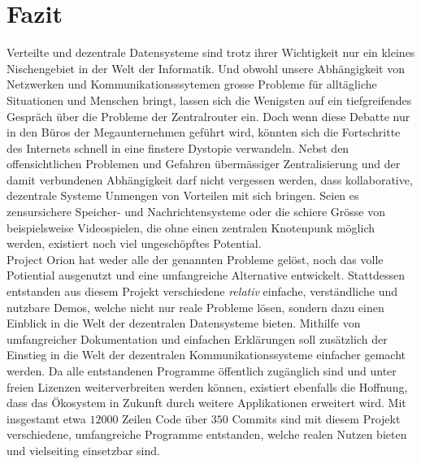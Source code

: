 \documentclass[11pt]{article}
\begin{document}
\section{Fazit}
\label{sec:org03182dd}
Verteilte und dezentrale Datensysteme sind trotz ihrer Wichtigkeit nur
ein kleines Nischengebiet in der Welt der Informatik. Und obwohl
unsere Abhängigkeit von Netzwerken und Kommunikationsssytemen grosse
Probleme für alltägliche Situationen und Menschen bringt, lassen sich
die Wenigsten auf ein tiefgreifendes Gespräch über die Probleme der
Zentralrouter ein. Doch wenn diese Debatte nur in den Büros der
Megaunternehmen geführt wird, könnten sich die Fortschritte des
Internets schnell in eine finstere Dystopie verwandeln. Nebst den
offensichtlichen Problemen und Gefahren übermässiger Zentralisierung
und der damit verbundenen Abhängigkeit darf nicht vergessen werden,
dass kollaborative, dezentrale Systeme Unmengen von Vorteilen mit sich
bringen. Seien es zensursichere Speicher- und Nachrichtensysteme oder
die schiere Grösse von beispielsweise Videospielen, die ohne einen
zentralen Knotenpunk möglich werden, existiert noch viel ungeschöpftes
Potential.\\

\noindent Project Orion hat weder alle der genannten Probleme gelöst,
noch das volle Potiential ausgenutzt und eine umfangreiche Alternative
entwickelt. Stattdessen entstanden aus diesem Projekt verschiedene
\emph{relativ} einfache, verständliche und nutzbare Demos, welche nicht nur
reale Probleme lösen, sondern dazu einen Einblick in die Welt der
dezentralen Datensysteme bieten. Mithilfe von umfangreicher
Dokumentation und einfachen Erklärungen soll zusätzlich der Einstieg
in die Welt der dezentralen Kommunikationssysteme einfacher gemacht
werden. Da alle entstandenen Programme öffentlich zugänglich sind und
unter freien Lizenzen weiterverbreiten werden können, existiert
ebenfalls die Hoffnung, dass das Ökosystem in Zukunft durch weitere
Applikationen erweitert wird. Mit insgestamt etwa \(12000\) Zeilen
Code über \(350\) Commits sind mit diesem Projekt verschiedene,
umfangreiche Programme entstanden, welche realen Nutzen bieten und
vielseiting einsetzbar sind.


\end{document}

